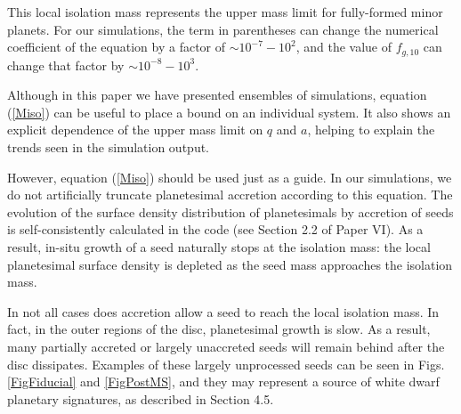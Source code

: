 \documentclass[useAMS,usenatbib]{mn2e}
\newcommand{\rev}{ }
\begin{document}
This local isolation mass represents the upper mass limit for fully-formed minor planets. For our simulations, the term in parentheses can change the numerical coefficient of the equation by a {\rev factor of $\sim 10^{-7}-10^{2}$}, and the value of $f_{g,10}$ can change {\rev that factor by $\sim 10^{-8}-10^3$}.

Although in this paper we have presented ensembles of simulations, equation (\ref{Miso}) can be useful to place a bound on an individual system. It also shows an explicit dependence of the upper mass limit on $q$ and $a$, helping to explain the trends seen in the simulation output.

However, equation (\ref{Miso}) should be used just as a guide. In our simulations, we do not artificially truncate planetesimal accretion according to this equation. The evolution of the surface density distribution of planetesimals by accretion of seeds is self-consistently calculated in the code (see Section 2.2 of Paper VI). As a result, in-situ growth of a seed naturally stops at the isolation mass: the local planetesimal surface density is depleted as the seed mass approaches the isolation mass.  

In not all cases does accretion allow a seed to reach the local isolation mass. In fact, in the outer regions of the disc, planetesimal growth is slow. As a result, many partially accreted or largely unaccreted seeds will remain behind after the disc dissipates. Examples of these largely unprocessed seeds can be seen in Figs. \ref{FigFiducial} and \ref{FigPostMS}, and they may represent a source of white dwarf planetary signatures, as described {\rev in Section 4.5}.
\end{document}
